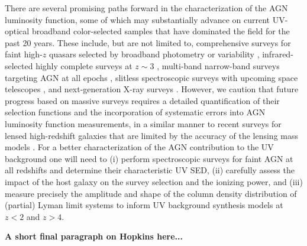 \documentclass[fleqn,usenatbib]{mnras}
\begin{document}
There are several promising paths forward in the characterization of the AGN luminosity function,
some of which may substantially advance on current UV-optical broadband color-selected samples that have
dominated the field for the past 20 years. These include, but are not limited to, comprehensive surveys for
faint high-$z$ quasars selected by broadband photometry \citep{2016ApJ...828...26M,2017ApJ...839...27W}
or variability \citep{2017MNRAS.464.1693H}, infrared-selected highly complete surveys at $z\sim 3$
\citep{2017ApJ...851...13S,2018AJ....155..110Y},
multi-band narrow-band surveys targeting AGN at all epochs \citep{2014arXiv1403.5237B},
slitless spectroscopic surveys with upcoming space telescopes \citep{2011arXiv1110.3193L, 2013arXiv1305.5422S},
and next-generation X-ray surveys \citep[e.g.][]{2013A&A...558A..89K}. However, we caution that future progress
based on massive surveys requires a detailed quantification of their selection functions and the incorporation
of systematic errors into AGN luminosity function measurements, in a similar manner to recent surveys for
lensed high-redshift galaxies that are limited by the accuracy of the lensing mass models
\citep{2017ApJ...843..129B,2018ApJ...854...73I,2018arXiv180309747A}.
For a better characterization of the AGN contribution to the UV background one will need to
(i) perform spectroscopic surveys for faint AGN at all redshifts and determine their characteristic UV SED,
(ii) carefully assess the impact of the host galaxy on the survey selection and the ionizing power,
and (iii) measure precisely the amplitude and shape of the column density distribution of (partial)
 Lyman limit systems to inform UV background synthesis models at $z<2$ and $z>4$.

\textbf{A short final paragraph on Hopkins here...}


\end{document}

